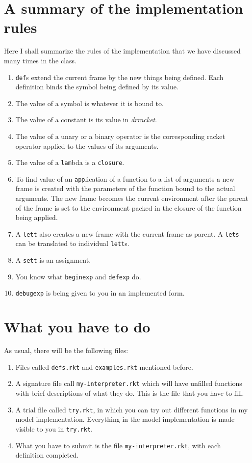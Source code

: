 \documentclass[11pt]{article}
\begin{document}
\section{A summary of the implementation rules}
Here I shall summarize the rules of the implementation that we have discussed many times in the class. 
\begin{enumerate}
    \item  {\tt def}s extend the current frame by the new things being defined. Each definition binds the symbol being defined by its value.
    \item The value of a symbol is whatever it is bound to.
    \item The value of a constant is its value in \textit{drracket}.
    \item The value of a unary or a binary operator is the corresponding racket operator applied to the values of its arguments.
    \item The value of a {\tt lam}bda is a  {\tt closure}.
    \item To find  value of an {\tt app}lication of a function to a list of arguments  a new frame is created with the parameters of the function bound to the actual arguments. The new frame becomes the current environment after the parent of the frame is set to the environment packed in the closure of the function being applied.
    \item A {\tt lett} also creates a new frame with the current frame as parent. A {\tt lets} can be translated to individual {\tt lett}s.
    \item A {\tt sett} is an assignment.
    \item You know what {\tt beginexp} and {\tt defexp} do.   
    \item {\tt debugexp} is being given to you in an implemented form. 
\end{enumerate}   
\section{What you have to do}
As usual, there will be the following files:
\begin{enumerate}
 \item Files called {\tt defs.rkt} and {\tt examples.rkt} mentioned before.
 \item A signature file call {\tt my-interpreter.rkt} which will have unfilled functions with brief descriptions of what they do. This is the file that you have to fill.
 \item A trial file called  {\tt try.rkt}, in which you can try out different functions in my model implementation. Everything in the model implementation is made visible to you in {\tt try.rkt}. 
 \item What you have to submit is the file {\tt my-interpreter.rkt}, with each definition completed.   
\end{enumerate}
\end{document}
